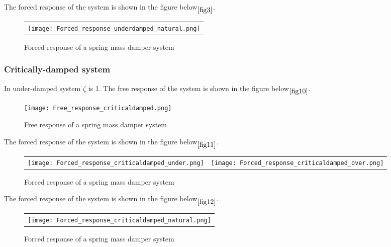 \documentclass[10pt]{beamer}
\begin{document}
\begin{frame}
The forced response of the system is shown in the figure below$\phantom{}_{\ref{fig3}}$.

\begin{figure}[h]
	\begin{tabular} {l}
	\texttt{[image: Forced\_response\_underdamped\_natural.png]} 
	\end{tabular}
	\caption{Forced response of a spring mass damper system}
\end{figure}
\label{fig3} 

\end{frame}


\begin{frame}
\frametitle{Critically-damped system}
In under-damped system $\zeta$ is 1.
The free response of the system is shown in the figure below$\phantom{}_{\ref{fig10}}$.

\begin{figure}[h]
	\centering
	\texttt{[image: Free\_response\_criticaldamped.png]}
	\caption{Free response of a spring mass damper system}
\end{figure}
\label{fig10}

\end{frame}


\begin{frame}
The forced response of the system is shown in the figure below$\phantom{}_{\ref{fig11}}$.

\begin{figure}[h]
	\begin{tabular} {l c}
	\texttt{[image: Forced\_response\_criticaldamped\_under.png]} &
	\texttt{[image: Forced\_response\_criticaldamped\_over.png]} 
	\end{tabular}
	\caption{Forced response of a spring mass damper system}
\end{figure}
\label{fig11}

\end{frame}
 
\begin{frame}
The forced response of the system is shown in the figure below$\phantom{}_{\ref{fig12}}$.

\begin{figure}[h]
	\begin{tabular} {l}
	\texttt{[image: Forced\_response\_criticaldamped\_natural.png]} 
	\end{tabular}
	\caption{Forced response of a spring mass damper system}
\end{figure}
\label{fig12} 

\end{frame}
\end{document}
